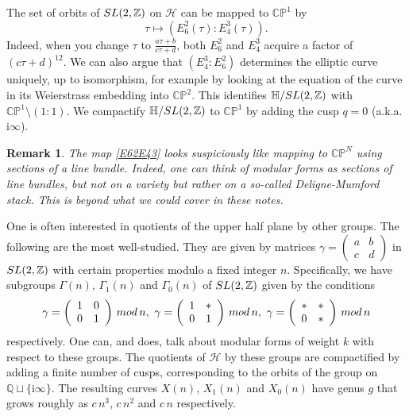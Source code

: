 \documentclass[11pt]{article}
\numberwithin{equation}{section}
\numberwithin{footnote}{section}
\newtheorem{rem}[thm]{Remark}
\newcommand{\blue}{\color{blue}}
\newcommand{\ii}{{\mathrm i}}
\renewcommand{\P}{{\mathbb P}}
\newcommand{\Q}{{\mathbb Q}}
\newcommand{\Z}{{\mathbb Z}}
\renewcommand{\H}{{\mathbb H}}
\newcommand{\C}{{\mathbb C}}
\begin{document}
\smallskip
The set of orbits of ${\rm SL}(2,\Z)$ on $\mathcal H$ can be mapped to $\C\P^1$ by
\begin{equation}\label{E62E43}
\tau \mapsto (E_6^2(\tau):E_4^3(\tau)).
\end{equation}
Indeed, when you change $\tau$ to $\frac {a\tau +b}{c\tau+d}$, both $E_6^2$ and $E_4^3$ acquire a factor of $(c\tau +d)^{12}$. We can also argue that $(E_4^3 : E_6^2)$ determines the elliptic curve uniquely, up to isomorphism, for example by looking at the equation of the curve in its Weierstrass embedding into $\C\P^2$. This identifies $\mathcal \H/{\rm SL}(2,\Z)$ with $\C\P^1\setminus (1:1)$. We compactify  $\mathcal \H/{\rm SL}(2,\Z)$ to $\C\P^1$ by adding the {\blue cusp} $q=0$ (a.k.a. $\ii\infty$).

\smallskip
\begin{rem}
The map \eqref{E62E43} looks suspiciously like mapping to $\C\P^N$ using sections of a line bundle. Indeed, one can think of modular forms as sections of line bundles, but not on a variety but rather on a so-called Deligne-Mumford stack. This is beyond what we could cover in these notes.
\end{rem}

\smallskip
One is often interested in quotients of the upper half plane by other groups. The following are the most well-studied.
They are given by matrices $\gamma =\left( \begin{array}{cc}a&b\\c&d\end{array}\right)$ in ${\rm SL}(2,\Z)$ 
with certain properties modulo a fixed integer $n$. Specifically, we have subgroups 
$\Gamma(n)$, $\Gamma_1(n)$ and $\Gamma_0(n)$ of ${\rm SL}(2,\Z)$ given by the conditions
\begin{align*}
\gamma = \left( \begin{array}{cc}1&0\\0&1\end{array}\right)\,{\rm mod}\,n,~
 \gamma = \left( \begin{array}{cc}1&*\\0&1\end{array}\right)\,{\rm mod}\,n,~
 \gamma = \left( \begin{array}{cc}*&*\\0&*\end{array}\right)\,{\rm mod}\,n
\end{align*}
respectively. One can, and does, talk about modular forms of weight $k$ with respect to these groups. 
The quotients of $\mathcal H$ by these groups are compactified by adding a finite number of cusps, corresponding to the orbits of the group on $\Q\sqcup\{\ii\infty\}$. The resulting curves $X(n)$, $X_1(n)$ and $X_0(n)$ have genus $g$ that grows roughly as $c\,n^3$, $c\,n^2$ and $c\,n$ respectively.
\end{document}
